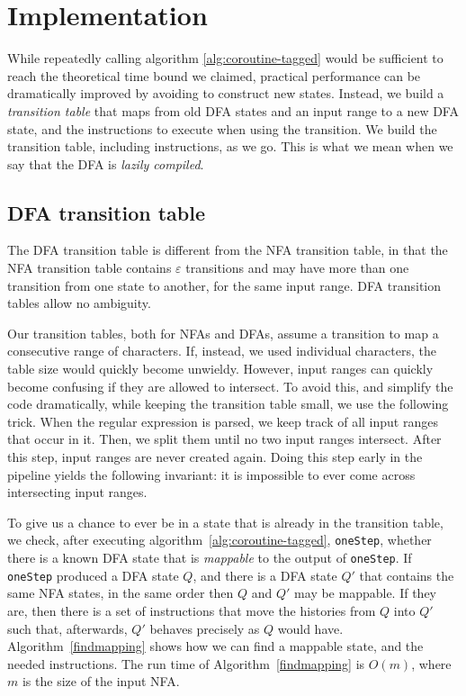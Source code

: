 \documentclass[11pt,a4paper,twoside,openright]{Thesis}
\theoremstyle{definition}
\begin{document}
\chapter{Implementation}
While repeatedly calling algorithm \ref{alg:coroutine-tagged} would be sufficient
to reach the theoretical time bound we claimed, practical performance
can be dramatically improved by avoiding to construct new states.
Instead, we build a \emph{transition table} that maps from old DFA
states and an input range to a new DFA state, and the instructions
to execute when using the transition. We build the transition table,
including instructions, as we go. This is what we mean when we say
that the DFA is \emph{lazily compiled}. 

\section{DFA transition table}
The DFA transition table is different from the NFA transition table,
in that the NFA transition table contains $\varepsilon$ transitions and
may have more than one transition from one state to another, for
the same input range. DFA transition tables allow no ambiguity.

Our transition tables, both for NFAs and DFAs, assume a transition
to map a consecutive range of characters. If, instead, we used
individual characters, the table size would quickly become unwieldy.
However, input ranges can quickly become confusing if they are
allowed to intersect. To avoid this, and simplify the code dramatically,
while keeping the transition table small, we use the following
trick. When the regular expression is parsed, we keep track of all
input ranges that occur in it. Then, we split them until no two
input ranges intersect.  After this step, input ranges are never
created again.  Doing this step early in the pipeline yields the
following invariant: it is impossible to ever come across intersecting
input ranges.

To give us a chance to ever be in a state that is already in the
transition table, we check, after executing algorithm~\ref{alg:coroutine-tagged},
\texttt{oneStep}, whether there is a known DFA state that is
\emph{mappable} to the output of \texttt{oneStep}.  If \texttt{oneStep}
produced a DFA state $Q$, and there is a DFA state $Q'$ that contains
the same NFA states, in the same order then $Q$ and $Q'$ may be
mappable.  If they are, then there is a set of instructions that
move the histories from $Q$ into $Q'$ such that, afterwards, $Q'$
behaves precisely as $Q$ would have. Algorithm~\ref{findmapping}
shows how we can find a mappable state, and the needed instructions.
The run time of Algorithm~\ref{findmapping} is $O(m)$, where $m$
is the size of the input NFA.
\end{document}
